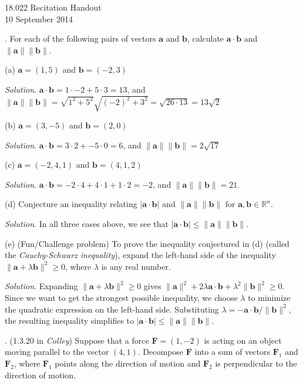 \documentclass[11pt]{article}
\theoremstyle{definition}
\newcommand{\R}{\mathbb{R}}
\newcounter{prob}
\newcommand\itm{\theprob.  \stepcounter{prob}}
\newcommand\sol[2]{\textit{Solution}. #1}
\newcommand\sol[2]{#2}
\begin{document}
\thispagestyle{empty}

\begin{center}
  18.022 Recitation Handout \iftoggle{solutions}{(with solutions)}{} \\
  10 September 2014 
\end{center}

\itm For each of the following pairs of vectors $\mathbf{a}$ and $\mathbf{b}$, calculate $ \mathbf{a}\cdot \mathbf{b} $ and $\|\mathbf{a}\|\|\mathbf{b}\|$. 

(a) $\mathbf{a}=(1,5)$ and $\mathbf{b}=(-2,3)$ 

\sol{$\mathbf{a}\cdot\mathbf{b} = 1\cdot-2 + 5\cdot 3 = 13$, and $\|\mathbf{a}\|\|\mathbf{b}\|=\sqrt{1^2+5^2}\sqrt{(-2)^2+3^2}=\sqrt{26\cdot 13}=13\sqrt{2}$}{}

(b) $\mathbf{a}=(3,-5)$ and $\mathbf{b}=(2,0)$ 

\sol{$\mathbf{a}\cdot\mathbf{b} = 3\cdot2 + -5\cdot 0 = 6$, and $\|\mathbf{a}\|\|\mathbf{b}\|=2\sqrt{17}$}{}

(c) $\mathbf{a}=(-2,4,1)$ and $\mathbf{b}=(4,1,2)$ 

\sol{$\mathbf{a}\cdot\mathbf{b} = -2\cdot4 + 4\cdot 1+1\cdot2 = -2$, and $\|\mathbf{a}\|\|\mathbf{b}\|=21.$}{}

(d) Conjecture an inequality relating $|\mathbf{a}\cdot \mathbf{b}|$ and $\|\mathbf{a}\|\|\mathbf{b}\|$ for $\mathbf{a},\mathbf{b}\in \R^n$.

\sol{In all three cases above, we see that $|\mathbf{a}\cdot \mathbf{b}|\leq \|\mathbf{a}\|\|\mathbf{b}\|$.}{}

(e) (Fun/Challenge problem) To prove the inequality conjectured in (d) (called the \textit{Cauchy-Schwarz inequality}), expand the left-hand side of the inequality $\|\mathbf{a}+\lambda\mathbf{b}\|^2\geq 0$, where $\lambda$ is any real number. 

\sol{Expanding $\|\mathbf{a}+\lambda\mathbf{b}\|^2\geq 0$ gives $\|\mathbf{a}\|^2+2\lambda \mathbf{a}\cdot \mathbf{b} + \lambda^2 \|\mathbf{b}\|^2 \geq 0$. Since we want to get the strongest possible inequality, we choose $\lambda$ to minimize the quadratic expression on the left-hand side. Substituting $\lambda = -\mathbf{a}\cdot\mathbf{b}/\|\mathbf{b}\|^2$, the resulting inequality simplifies to $|\mathbf{a}\cdot \mathbf{b}|\leq \|\mathbf{a}\|\|\mathbf{b}\|$.}
{
\vfill
}

\itm (1.3.20 in \textit{Colley}) Suppose that a force $\mathbf{F}=(1,-2)$ is acting on an object moving parallel to the vector $(4,1)$. Decompose $\mathbf{F}$ into a sum of vectors $\mathbf{F}_1$ and $\mathbf{F}_2$, where $\mathbf{F}_1$ points along the direction of motion and $\mathbf{F}_2$ is perpendicular to the direction of motion.
\end{document}
